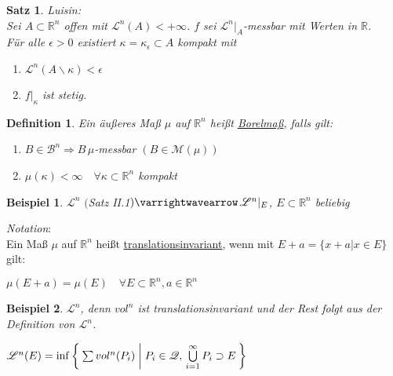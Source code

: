\documentclass[11pt]{memoir}
\theoremstyle{changebreak}
\newtheorem{Definition}{Definition}[chapter]
\newtheorem{Beispiel}{Beispiel}[chapter]
\newtheorem{Satz}{Satz}[chapter]
\begin{document}
\begin{Satz}
\emph{Luisin}: \\
Sei $A \subset \mathbb R^n$ offen mit $\mathscr L^n(A) < + \infty$. $f$ sei $\mathscr L^n|_A$-messbar mit Werten in $\mathbb R$. \\
Für alle $\epsilon > 0$ existiert $\kappa = \kappa_\epsilon \subset A$ kompakt mit
\begin{enumerate}
	\item $\mathscr L^n(A \backslash \kappa) < \epsilon$
	\item $f|_\kappa$ ist stetig.
\end{enumerate}
\end{Satz}



\begin{Definition}
Ein äußeres Maß $\mu$ auf $\mathbb R^n$ heißt \underline{Borelmaß}, falls gilt:
\begin{enumerate}
	\item $B \in \mathscr B^n \Rightarrow B \, \mu$-messbar $(B \in \mathscr M(\mu))$
	\item $\mu(\kappa) < \infty \quad \forall \kappa \subset \mathbb R^n$ kompakt
\end{enumerate}
\end{Definition}

\begin{Beispiel}
$\mathscr L^n$ $($Satz II.1$) \varrightwavearrow \, \mathscr L^n|_E$, $E \subset \mathbb R^n$ beliebig
\end{Beispiel}

\emph{Notation}: \\
Ein Maß $\mu$ auf $\mathbb R^n$ heißt \underline{translationsinvariant}, wenn mit $E + a = \{x +a | x \in E\}$ gilt:
\begin{center}
	$\mu(E+a) = \mu(E) \quad \forall E \subset \mathbb R^n, a \in \mathbb R^n$
\end{center}

\begin{Beispiel}
$\mathscr L^n$, denn $vol^n$ ist translationsinvariant und der Rest folgt aus der Definition von $\mathscr L^n$. \\
\begin{center}
	$\mathscr L^n(E) = \inf\Set{ \sum vol^n(P_i) | P_i \in \mathscr Q, \,\bigcup\limits_{i=1}^\infty P_i \supset E }$
\end{center}
\end{Beispiel}
\end{document}

